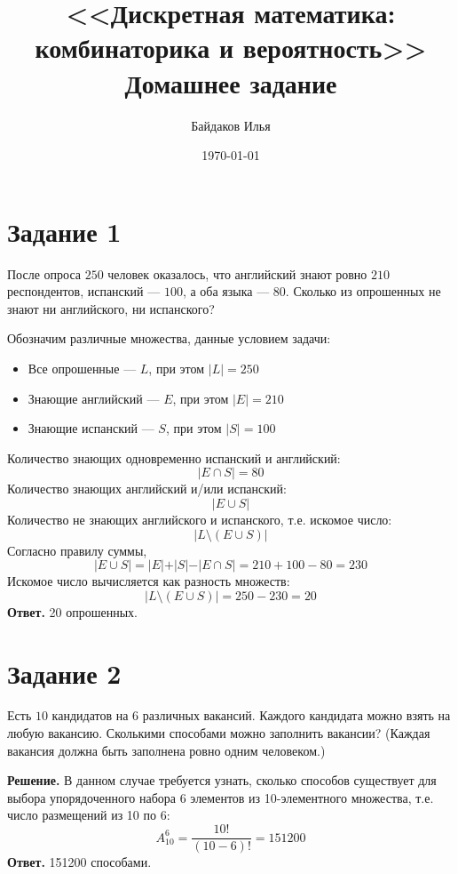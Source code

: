 \documentclass[a4paper,12pt]{article}
\begin{document}
\title{<<Дискретная математика: \\ комбинаторика и вероятность>> \\ \vspace{12pt} Домашнее задание}
\author{Байдаков Илья}
\date{\today}
\maketitle


\section*{Задание 1}
После опроса $250$ человек оказалось, что английский знают ровно $210$ респондентов, испанский --- $100$, а оба языка --- $80$. Сколько из опрошенных не знают ни английского, ни испанского? \par

 Обозначим различные множества, данные условием задачи:
\begin{itemize}
\item Все опрошенные --- $L$, при этом $\vert L \vert = 250$
\item Знающие английский --- $E$, при этом $\vert E \vert = 210$
\item Знающие испанский --- $S$, при этом $\vert S \vert = 100$
\end{itemize}
Количество знающих одновременно испанский и английский:
$$ \vert E \cap S \vert = 80 $$
Количество знающих английский и/или испанский:
$$ \vert E \cup S \vert $$
Количество не знающих английского и испанского, т.е. искомое число:
$$ \vert L \setminus ( E \cup S )\vert $$
Согласно правилу суммы,
$$ \vert E \cup S \vert = \vert E \vert + \vert S \vert - \vert E \cap S \vert = 210 + 100 - 80 = 230 $$
Искомое число вычисляется как разность множеств: 
$$ \vert L \setminus ( E \cup S )\vert =250-230=20$$
{\bf Ответ.} 20 опрошенных.

\section*{Задание 2}
Есть $10$ кандидатов на $6$ различных вакансий. Каждого кандидата можно взять на любую вакансию. Сколькими способами можно заполнить вакансии? (Каждая вакансия должна быть заполнена ровно одним человеком.)\par 
{\noindent \bf Решение.} В данном случае требуется узнать, сколько способов существует для выбора упорядоченного набора 6 элементов из 10-элементного множества, т.е. число размещений из 10 по 6:
$$A_{10}^6=\frac{10!}{(10-6)!}=151200$$
{\bf Ответ.} 151200 способами.
\end{document}
